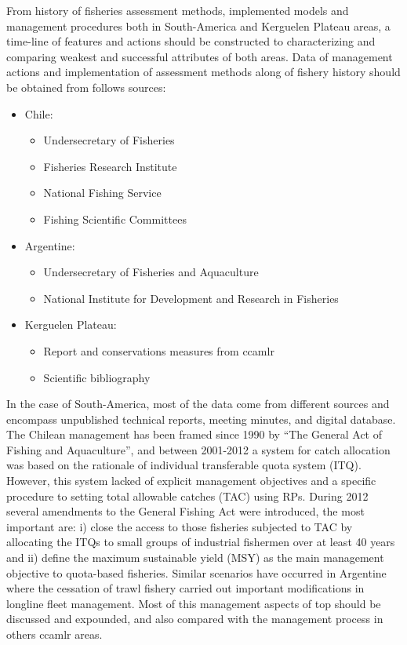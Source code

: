 From history of fisheries assessment methods, implemented models and management procedures both in South-America and Kerguelen Plateau areas, a time-line of features and actions should be constructed to characterizing and comparing weakest and successful attributes of both areas. Data of management actions and implementation of assessment methods along of fishery history should be obtained from follows sources:

{\small 
\begin{itemize}
	\item Chile:
	\begin{itemize}
		\item Undersecretary of Fisheries
		\item Fisheries Research Institute 
		\item National Fishing Service
		\item Fishing Scientific Committees   
	\end{itemize}
	\item Argentine:
	\begin{itemize}
		\item Undersecretary of Fisheries and Aquaculture
		\item National Institute for Development and Research in Fisheries
	\end{itemize}
		\item Kerguelen Plateau:
	\begin{itemize}
		\item Report and conservations measures from \ac{ccamlr}
		\item Scientific bibliography
	\end{itemize}
\end{itemize}
}

In the case of South-America, most of the data come from different sources and encompass unpublished technical reports, meeting minutes, and digital database. The Chilean management has been framed since 1990 by ``The General Act of Fishing and Aquaculture'', and between 2001-2012 a system for catch allocation was based on the rationale of individual transferable quota system (ITQ). However, this system lacked of explicit management objectives and a specific procedure to setting total allowable catches (TAC) using RPs. During 2012 several amendments to the General Fishing Act were introduced, the most important are: i) close the access to those fisheries subjected to TAC by allocating the ITQs to small groups of industrial fishermen over at least 40 years and ii) define the maximum sustainable yield (MSY) as the main management objective to quota-based fisheries. Similar scenarios have occurred in Argentine where the cessation of trawl fishery carried out important modifications in longline fleet management. Most of this management aspects of \acl{top} should be discussed and expounded, and also compared with the management process in others \ac{ccamlr} areas.


